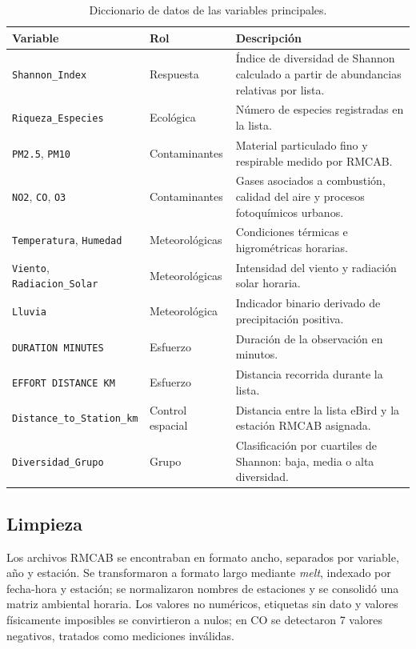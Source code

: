 \documentclass[9pt,letterpaper]{article}
\begin{document}
\begin{table}[H]
\centering
\caption{Diccionario de datos de las variables principales.}
\footnotesize
\begin{tabularx}{\linewidth}{p{3.0cm}p{2.4cm}X}
\toprule
Variable & Rol & Descripción \\
\midrule
\texttt{Shannon\_Index} & Respuesta & Índice de diversidad de Shannon calculado a partir de abundancias relativas por lista. \\
\texttt{Riqueza\_Especies} & Ecológica & Número de especies registradas en la lista. \\
\texttt{PM2.5}, \texttt{PM10} & Contaminantes & Material particulado fino y respirable medido por RMCAB. \\
\texttt{NO2}, \texttt{CO}, \texttt{O3} & Contaminantes & Gases asociados a combustión, calidad del aire y procesos fotoquímicos urbanos. \\
\texttt{Temperatura}, \texttt{Humedad} & Meteorológicas & Condiciones térmicas e higrométricas horarias. \\
\texttt{Viento}, \texttt{Radiacion\_Solar} & Meteorológicas & Intensidad del viento y radiación solar horaria. \\
\texttt{Lluvia} & Meteorológica & Indicador binario derivado de precipitación positiva. \\
\texttt{DURATION MINUTES} & Esfuerzo & Duración de la observación en minutos. \\
\texttt{EFFORT DISTANCE KM} & Esfuerzo & Distancia recorrida durante la lista. \\
\texttt{Distance\_to\_Station\_km} & Control espacial & Distancia entre la lista eBird y la estación RMCAB asignada. \\
\texttt{Diversidad\_Grupo} & Grupo & Clasificación por cuartiles de Shannon: baja, media o alta diversidad. \\
\bottomrule
\end{tabularx}
\end{table}

\subsection{Limpieza}

Los archivos RMCAB se encontraban en formato ancho, separados por variable, año y estación. Se transformaron a formato largo mediante \textit{melt}, indexado por fecha-hora y estación; se normalizaron nombres de estaciones y se consolidó una matriz ambiental horaria. Los valores no numéricos, etiquetas sin dato y valores físicamente imposibles se convirtieron a nulos; en CO se detectaron 7 valores negativos, tratados como mediciones inválidas.
\end{document}
